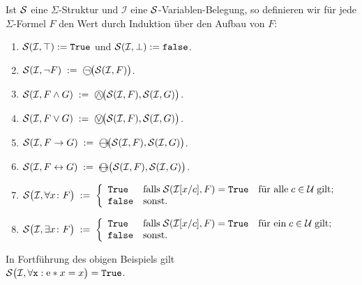 \begin{Definition}
    Ist $\mathcal{S}$ eine $\Sigma$-Struktur und $\mathcal{I}$ eine $\mathcal{S}$-Variablen-Belegung,
    so definieren wir für jede $\Sigma$-Formel $F$ den Wert 
    durch Induktion über den Aufbau von $F$:
    \begin{enumerate}
    \item $\mathcal{S}(\mathcal{I},\top) := \mathtt{True}$ und $\mathcal{S}(\mathcal{I},\bot) := \mathtt{false}$.
    \item $\struct(\mathcal{I}, \neg F) \;:=\; \circneg\bigl(\struct(\mathcal{I}, F)\bigr)$.
    \item $\struct(\mathcal{I}, F \wedge G) \;:=\; \circwedge\bigl(\struct(\mathcal{I}, F), \struct(\mathcal{I}, G)\bigr)$.
    \item $\struct(\mathcal{I}, F \vee G) \;:=\; \circvee\bigl(\struct(\mathcal{I}, F), \struct(\mathcal{I}, G)\bigr)$.
    \item $\struct(\mathcal{I}, F \rightarrow G) \;:=\; \circright\!\bigl(\struct(\mathcal{I}, F), \struct(\mathcal{I}, G)\bigr)$.
    \item $\struct(\mathcal{I}, F \leftrightarrow G) \;:=\; \circleftright\bigl(\struct(\mathcal{I}, F), \struct(\mathcal{I}, G)\bigr)$.
    \item $\mathcal{S}\bigl(\mathcal{I}, \forall x\colon F\bigr) \;:=\; \left\{
      \begin{array}{ll}
         \mathtt{True}  & \mbox{falls}\; \mathcal{S}(\mathcal{I}[x/c], F) = \mathtt{True}\quad \mbox{für alle}\; c\in \mathcal{U}\;\mbox{gilt}; \\
         \mathtt{false} & \mbox{sonst}.
      \end{array}
      \right.$
    \item $\mathcal{S}\bigl(\mathcal{I}, \exists x \colon F\bigr) \;:=\; \left\{
      \begin{array}{ll}
         \mathtt{True}  & \mbox{falls}\; \mathcal{S}(\mathcal{I}[x/c], F) = \mathtt{True}\quad \mbox{für ein}\; c\in \mathcal{U}\;\mbox{gilt}; \\
         \mathtt{false} & \mbox{sonst}.
      \end{array}
      \right.$\eox    
    \end{enumerate}
\end{Definition}

\example
In Fortführung des obigen Beispiels gilt \\[0.2cm]
\hspace*{1.3cm}  $\mathcal{S}\bigl(\mathcal{I}, \forall \mathtt{x}: \mathrm{e} * x = x \bigr) = \mathtt{True}$.
\eox

